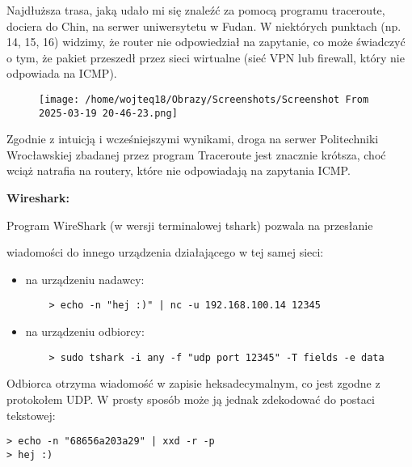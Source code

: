 \documentclass[12pt]{article}
\begin{document}
Najdłuższa trasa, jaką udało mi się znaleźć za pomocą programu traceroute, dociera do Chin, na serwer uniwersytetu w Fudan. 
W niektórych punktach (np. 14, 15, 16) widzimy, że router nie odpowiedział na zapytanie, co może świadczyć o tym, że pakiet przeszedł przez sieci wirtualne
(sieć VPN lub firewall, który nie odpowiada na ICMP).

\begin{figure}[H]
  \centering
  \texttt{[image: /home/wojteq18/Obrazy/Screenshots/Screenshot From 2025-03-19 20-46-23.png]}
  \label{fig:traceroute_poland}
\end{figure}

Zgodnie z intuicją i wcześniejszymi wynikami, droga na serwer Politechniki Wrocławskiej zbadanej przez program Traceroute jest znacznie krótsza,
choć wciąż natrafia na routery, które nie odpowiadają na zapytania ICMP.

\vspace{1\baselineskip}
\textbf{Wireshark:}

Program WireShark (w wersji terminalowej tshark) pozwala na przesłanie \par wiadomości do innego urządzenia działającego w tej samej sieci:
\begin{itemize}
  \item na urządzeniu nadawcy:
  \begin{verbatim}
    > echo -n "hej :)" | nc -u 192.168.100.14 12345
  \end{verbatim}
  \item na urządzeniu odbiorcy:
  \begin{verbatim}
    > sudo tshark -i any -f "udp port 12345" -T fields -e data
  \end{verbatim}
\end{itemize}

Odbiorca otrzyma wiadomość w zapisie heksadecymalnym, co jest zgodne z protokołem UDP. 
W prosty sposób może ją jednak zdekodować do postaci tekstowej:
\begin{verbatim}
> echo -n "68656a203a29" | xxd -r -p
> hej :)
\end{verbatim}
\end{document}
